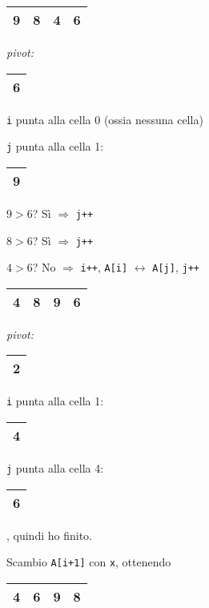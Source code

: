 \begin{center}
	\begin{tabular}{|l|l|l|l|}
		\hline
		9 & 8 & 4 & 6 \\
		\hline
	\end{tabular}
	\hspace{1cm}
	\emph{pivot: }
	\begin{tabular}{|l|}
		\hline
		6 \\
		\hline
	\end{tabular}
\end{center}

\texttt{i} punta alla cella 0 (ossia nessuna cella) \par
\texttt{j} punta alla cella 1:
\begin{tabular}{|l|}
	\hline
	9 \\
	\hline
\end{tabular}

$9 > 6$? Sì $\Rightarrow$ \texttt{j++} \par
$8 > 6$? Sì $\Rightarrow$ \texttt{j++} \par
$4 > 6$? No $\Rightarrow$ \texttt{i++}, \texttt{A[i]} $\leftrightarrow$ \texttt{A[j]}, \texttt{j++} \par

\begin{center}
	\begin{tabular}{|l|l|l|l|}
		\hline
		4 & 8 & 9 & 6 \\
		\hline
	\end{tabular}
	\hspace{1cm}
	\emph{pivot: }
	\begin{tabular}{|l|}
		\hline
		2 \\
		\hline
	\end{tabular}
\end{center}

\texttt{i} punta alla cella 1: 
\begin{tabular}{|l|}
	\hline
	4 \\
	\hline
\end{tabular} \par
\texttt{j} punta alla cella 4:
\begin{tabular}{|l|}
	\hline
	6 \\
	\hline
\end{tabular}, quindi ho finito. \par
Scambio \texttt{A[i+1]} con \texttt{x}, ottenendo \par
\begin{center}
	\begin{tabular}{|l|l|l|l|}
		\hline
		4 & 6 & 9 & 8 \\
		\hline
	\end{tabular}
\end{center}

